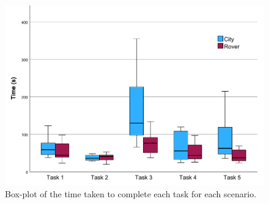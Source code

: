             \begin{figure}[h]
                \centering
                \includegraphics[width=1\linewidth]{figures/task_time_graph.pdf}
                \caption{Box-plot of the time taken to complete each task for each scenario.}
                \label{fig:task_time}
            \end{figure}


